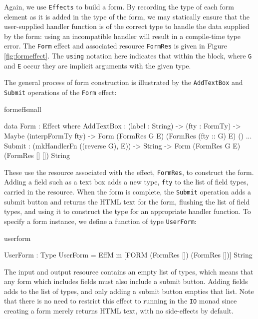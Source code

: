 \noindent
Again, we use \texttt{Effects} to build a form.
By recording
the type of each form element as it is added in the type of the form, we may
statically ensure that the user-supplied handler function is of the correct
type to handle the data supplied by the form: using an
incompatible handler will result in a compile-time type error. The \texttt{Form}
effect and associated resource \texttt{FormRes} is given in Figure 
\ref{fig:formeffect}.
The \texttt{using} notation here indicates that within
the block, where \texttt{G} and \texttt{E} occur they are implicit arguments with
the given type.

The general process of form construction is illustrated by the \texttt{AddTextBox}
and \texttt{Submit} operations of the \texttt{Form} effect:

\begin{SaveVerbatim}{formeffsmall}

data Form : Effect where
  AddTextBox : (label : String) -> (fty : FormTy) -> 
               Maybe (interpFormTy fty) -> 
               Form (FormRes G E) 
                    (FormRes (fty :: G) E) () 
     ...
  Submit : (mkHandlerFn ((reverse G), E)) -> String -> 
           Form (FormRes G E) (FormRes [] []) String

\end{SaveVerbatim}

\noindent
These use the resource associated with the effect, \texttt{FormRes}, to
construct the form. Adding a field such as a text box adds a new type,
\texttt{fty} to the list of field types, carried in the resource. When the form
is complete, the \texttt{Submit} operation adds a submit button and returns the
HTML text for the form, flushing the list of field types, and using it to
construct the type for an appropriate handler function.
%
To specify a form instance, we define a function of type \texttt{UserForm}:

\begin{SaveVerbatim}{userform}

UserForm : Type
UserForm = EffM m [FORM (FormRes []) 
                        (FormRes [])] String

\end{SaveVerbatim}

\noindent
%
The input and output resource contains an empty list of types, which means that
any form which includes fields must also include a submit button. Adding fields
adds to the list of types, and only adding a submit button empties that list.
Note that there is no need to restrict this effect to running in the \texttt{IO}
monad since creating a form merely returns HTML text, with no side-effects by
default.

